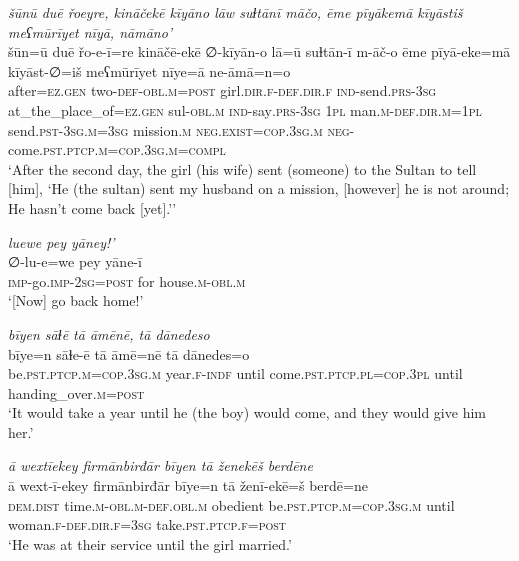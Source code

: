 \ea \label{ŽH.110}
\textit{šūnū duē řoeyre, kināčekē kīyāno lāw suɫtānī māčo, ēme pīyākemā kīyāstiš meʕmūrīyet nīyā, nāmāno’} \\ 
\gll šūn=ū duē řo-e-ī=re kināčē-ekē ∅-kīyān-o lā=ū suɫtān-ī m-āč-o ēme pīyā-eke=mā kīyāst-∅=iš meʕmūrīyet nīye=ā ne-āmā=n=o \\ 
 after\textsc{=ez}\textsc{.gen} two\textsc{-def}\textsc{-obl}\textsc{.m}\textsc{=\textsc{post}} girl\textsc{.dir}\textsc{\textsc{.f}}\textsc{-def}\textsc{.dir}\textsc{\textsc{.f}} \textsc{ind-}send\textsc{.prs}\textsc{-3sg} at\_the\_place\_of\textsc{=ez}\textsc{.gen} sul\textsc{-obl}\textsc{.m} \textsc{ind-}say\textsc{.prs}\textsc{-3sg} \textsc{1pl} man\textsc{.m}\textsc{-def}\textsc{.dir}\textsc{.m}\textsc{=1pl} send\textsc{.pst}\textsc{-3sg}\textsc{.m}\textsc{=3sg} mission\textsc{.m} \textsc{\textsc{neg.}exist}\textsc{=cop}\textsc{.3sg}\textsc{.m} \textsc{neg-}come\textsc{.pst}\textsc{.ptcp}\textsc{.m}\textsc{=cop}\textsc{.3sg}\textsc{.m}\textsc{=compl} \\ 
\glt `After the second day, the girl (his wife) sent (someone) to the Sultan to tell [him], ‘He (the sultan) sent my husband on a mission, [however] he is not around; He hasn’t come back [yet].’'
\z 
 
\ea \label{ŽH.118}
\textit{luewe pey yāney!’} \\ 
\gll ∅-lu-e=we pey yāne-ī \\ 
 \textsc{imp-}go.\textsc{imp-}\textsc{2sg}\textsc{=\textsc{post}} for house\textsc{.m}\textsc{-obl}\textsc{.m} \\ 
\glt `[Now] go back home!'
\z 
 
\ea \label{RE.15}
\textit{bīyen sāɫē tā āmēnē, tā dānedeso} \\ 
\gll bīye=n sāɫe-ē tā āmē=nē tā dānedes=o \\ 
 be\textsc{.pst}\textsc{.ptcp}\textsc{.m}\textsc{=cop}\textsc{.3sg}\textsc{.m} year\textsc{.f}\textsc{-indf} until come\textsc{.pst}\textsc{.ptcp}\textsc{.pl}\textsc{=cop}\textsc{.3pl} until handing\_over\textsc{.m}\textsc{=\textsc{post}} \\ 
\glt `It would take a year until he (the boy) would come, and they would give him her.'
\z 
 
\ea \label{RE.21}
\textit{ā wextīekey firmānbirđār bīyen tā ženekēš berdēne} \\ 
\gll ā wext-ī-ekey firmānbirđār bīye=n tā ženī-ekē=š berdē=ne \\ 
 \textsc{dem.dist} time\textsc{.m}\textsc{-obl}\textsc{.m}\textsc{-def}\textsc{.obl}\textsc{.m} obedient be\textsc{.pst}\textsc{.ptcp}\textsc{.m}\textsc{=cop}\textsc{.3sg}\textsc{.m} until woman\textsc{.f}\textsc{-def}\textsc{.dir}\textsc{.f}\textsc{=3sg} take\textsc{.pst}\textsc{.ptcp}\textsc{.f}\textsc{=\textsc{post}} \\ 
\glt `He was at their service until the girl married.'
\z 
 
